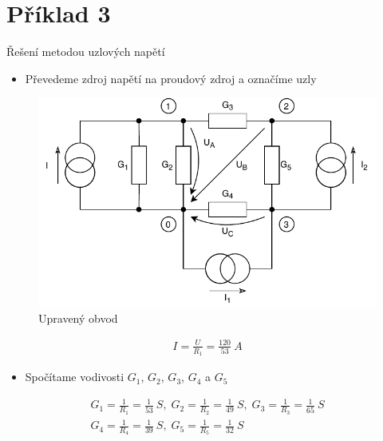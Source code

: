 \section{Příklad 3}

\begin{center}
    \begin{LARGE}
        Řešení metodou uzlových napětí
    \end{LARGE}
\end{center}
\setcounter{figure}{0}

\begin{itemize}
    \item Převedeme zdroj napětí na proudový zdroj a označíme uzly
\end{itemize}

\begin{figure}[h]
    \centering
    \includegraphics[scale=0.8,keepaspectratio]{fig/Pr3_krok1.pdf}
    \caption{Upravený obvod}
    \label{pic:Pr3_krok1}
\end{figure}

\begin{center}
    \begin{gather*}
        I = \frac{U}{R_1} = \frac{120}{53} \: A
    \end{gather*}
\end{center}

\newpage

\begin{itemize}
    \item Spočítame vodivosti $G_1$, $G_2$, $G_3$, $G_4$ a $G_5$
\end{itemize}

\begin{center}
    \begin{gather*}
        G_1 = \frac{1}{R_1} = \frac{1}{53} \: S , \;
        G_2 = \frac{1}{R_2} = \frac{1}{49} \: S , \;
        G_3 = \frac{1}{R_3} = \frac{1}{65} \: S \\
        G_4 = \frac{1}{R_4} = \frac{1}{39} \: S , \;
        G_5 = \frac{1}{R_5} = \frac{1}{32} \: S \\
    \end{gather*}
\end{center}

